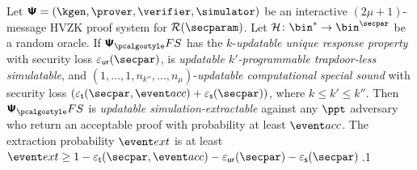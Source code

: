 
\begin{theorem}
	\label{thm:se}
	Let $\ps = (\kgen, \prover, \verifier, \simulator)$ be an interactive
	$(2 \mu + 1)$-message HVZK proof system for $\RELGEN(\secparam)$. Let
	$\ro \colon \bin^{*} \to \bin^{\secpar}$ be a random oracle. If $\psfs$ has the
	$k$-\emph{updatable unique response property} with security loss $\epsur(\secpar)$, is
	\emph{updatable $k'$-programmable trapdoor-less simulatable}, and $(1, \ldots, 1, n_{k''}, \ldots, n_\mu)$-\emph{updatable computational special sound} with security loss $(\epst (\secpar, \accProb) +  \epss(\secpar))$, where $k \leq k' \leq k''$. Then $\psfs$ is
	\emph{updatable simulation-extractable} against any $\ppt$ adversary who return an acceptable proof with probability at least $\accProb$.  The
	extraction probability $\extProb$ is at least
	$\extProb \geq 1 - \epst(\secpar, \accProb)
	- \epsur(\secpar) - \epss(\secpar)\,$.1
\end{theorem}

